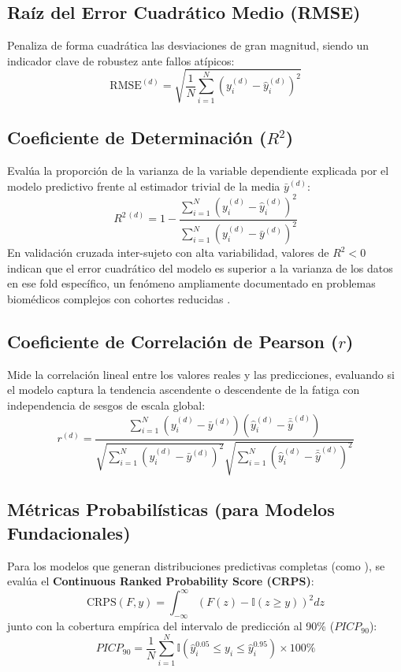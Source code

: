 \subsection{Raíz del Error Cuadrático Medio (RMSE)}
Penaliza de forma cuadrática las desviaciones de gran magnitud, siendo un indicador clave de robustez ante fallos atípicos:
\begin{equation}
    \text{RMSE}^{(d)} = \sqrt{\frac{1}{N} \sum_{i=1}^N \left( y_i^{(d)} - \hat{y}_i^{(d)} \right)^2}
\end{equation}

\subsection{Coeficiente de Determinación ($R^2$)}
Evalúa la proporción de la varianza de la variable dependiente explicada por el modelo predictivo frente al estimador trivial de la media $\bar{y}^{(d)}$:
\begin{equation}
    R^{2\,(d)} = 1 - \frac{\sum_{i=1}^N \left( y_i^{(d)} - \hat{y}_i^{(d)} \right)^2}{\sum_{i=1}^N \left( y_i^{(d)} - \bar{y}^{(d)} \right)^2}
\end{equation}
En validación cruzada inter-sujeto con alta variabilidad, valores de $R^2 < 0$ indican que el error cuadrático del modelo es superior a la varianza de los datos en ese fold específico, un fenómeno ampliamente documentado en problemas biomédicos complejos con cohortes reducidas \cite{kalanadhabhatta2022fatigueset}.

\subsection{Coeficiente de Correlación de Pearson ($r$)}
Mide la correlación lineal entre los valores reales y las predicciones, evaluando si el modelo captura la tendencia ascendente o descendente de la fatiga con independencia de sesgos de escala global:
\begin{equation}
    r^{(d)} = \frac{\sum_{i=1}^N (y_i^{(d)} - \bar{y}^{(d)})(\hat{y}_i^{(d)} - \bar{\hat{y}}^{(d)})}{\sqrt{\sum_{i=1}^N (y_i^{(d)} - \bar{y}^{(d)})^2} \sqrt{\sum_{i=1}^N (\hat{y}_i^{(d)} - \bar{\hat{y}}^{(d)})^2}}
\end{equation}

\subsection{Métricas Probabilísticas (para Modelos Fundacionales)}
Para los modelos que generan distribuciones predictivas completas (como \chronos{}), se evalúa el \textbf{Continuous Ranked Probability Score (CRPS)}:
\begin{equation}
    \text{CRPS}(F, y) = \int_{-\infty}^\infty \left( F(z) - \mathbb{I}(z \ge y) \right)^2 dz
\end{equation}
junto con la cobertura empírica del intervalo de predicción al 90\% ($PICP_{90}$):
\begin{equation}
    PICP_{90} = \frac{1}{N}\sum_{i=1}^N \mathbb{I}\left( \hat{y}_{i}^{0.05} \le y_i \le \hat{y}_{i}^{0.95} \right) \times 100\%
\end{equation}


